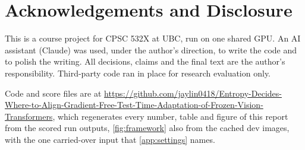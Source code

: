 \documentclass{article}
\begin{document}
\section{Acknowledgements and Disclosure}
\label{app:disclosure}
This is a course project for CPSC 532X at UBC, run on one shared GPU. An AI assistant (Claude) was used, under the author's direction, to write the code and to polish the writing. All decisions, claims and the final text are the author's responsibility. Third-party code ran in place for research evaluation only. {\raggedright Code and score files are at \url{https://github.com/jaylin0418/Entropy-Decides-Where-to-Align-Gradient-Free-Test-Time-Adaptation-of-Frozen-Vision-Transformers}, which regenerates every number, table and figure of this report from the scored run outputs, \cref{fig:framework} also from the cached dev images, with the one carried-over input that \cref{app:settings} names.\par}
\end{document}
